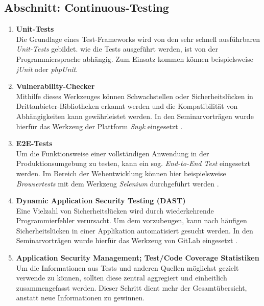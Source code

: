 \subsection{Abschnitt: Continuous-Testing}
\begin{enumerate}[resume]
    \itemsep-0.5em 
    \item \textbf{Unit-Tests}\label{Unit-Tests} \\
        Die Grundlage eines Test-Frameworks wird von den sehr schnell ausführbaren \emph{Unit-Tests} gebildet. wie die Tests ausgeführt werden, ist von der Programmiersprache abhängig. Zum Einsatz kommen können beispielsweise \emph{jUnit} oder \emph{phpUnit}.
    \item \textbf{Vulnerability-Checker}\label{Vulnerability-Checker} \\
        Mithilfe dieses Werkzeuges können Schwachstellen oder Sicherheitslücken in Drittan\-bieter-Bibliotheken erkannt werden und die Kompatibilität von Abhängigkeiten kann gewährleistet werden. In den Seminarvorträgen wurde hierfür das Werkzeug der Plattform \emph{Snyk} eingesetzt \cite{snykOpenSourceSecurity}.
    \item \textbf{E2E-Tests}\label{E2E-Tests} \\
        Um die Funktionsweise einer vollständigen Anwendung in der Produktionsumgebung zu testen, kann ein sog. \emph{End-to-End Test} eingesetzt werden. 
        Im Bereich der Webentwicklung können hier beispielsweise \emph{Browsertests} mit dem Werkzeug \emph{Selenium} durchgeführt werden \cite{seleniumSeleniumAutomatesBrowsers}.
    \item \textbf{Dynamic Application Security Testing (DAST)}\label{Dynamic Application Security Testing (DAST)} \\
        Eine Vielzahl von Sicherheitslücken wird durch wiederkehrende Programmierfehler verursacht. Um dem vorzubeugen, kann nach häufigen Sicherheitslücken in einer Applikation automatisiert gesucht werden. In den Seminarvorträgen wurde hierfür das Werkzeug von GitLab eingesetzt \cite{gitlabDynamicApplicationSecurity}.
    \item \textbf{Application Security Management; Test/Code Coverage Statistiken}\label{Test/Code Coverage Statistiken} \\
        Um die Informationen aus Tests und anderen Quellen möglichst gezielt verwende zu können, sollten diese zentral aggregiert und einheitlich zusammengefasst werden. 
        Dieser Schritt dient mehr der Gesamtübersicht, anstatt neue Informationen zu gewinnen.
\end{enumerate}

